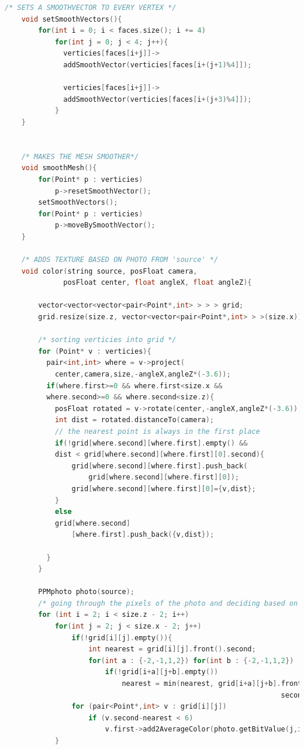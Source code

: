 \documentclass[12pt]{report}			%
\begin{document}
\begin{appendices}
\begin{lstlisting}[language = C++]
    /* SETS A SMOOTHVECTOR TO EVERY VERTEX */
    void setSmoothVectors(){
        for(int i = 0; i < faces.size(); i += 4)
            for(int j = 0; j < 4; j++){
              verticies[faces[i+j]]->
              addSmoothVector(verticies[faces[i+(j+1)%4]]);
                
              verticies[faces[i+j]]->
              addSmoothVector(verticies[faces[i+(j+3)%4]]);
            }
    }


    /* MAKES THE MESH SMOOTHER*/
    void smoothMesh(){
        for(Point* p : verticies)
            p->resetSmoothVector();
        setSmoothVectors();
        for(Point* p : verticies)
            p->moveBySmoothVector();
    }

    /* ADDS TEXTURE BASED ON PHOTO FROM 'source' */
    void color(string source, posFloat camera,
              posFloat center, float angleX, float angleZ){

        vector<vector<vector<pair<Point*,int> > > > grid;
        grid.resize(size.z, vector<vector<pair<Point*,int> > >(size.x));

        /* sorting verticies into grid */
        for (Point* v : verticies){
          pair<int,int> where = v->project(
            center,camera,size,-angleX,angleZ*(-3.6));
          if(where.first>=0 && where.first<size.x &&
          where.second>=0 && where.second<size.z){
            posFloat rotated = v->rotate(center,-angleX,angleZ*(-3.6));
            int dist = rotated.distanceTo(camera);
            // the nearest point is always in the first place
            if(!grid[where.second][where.first].empty() &&
            dist < grid[where.second][where.first][0].second){
                grid[where.second][where.first].push_back(
                    grid[where.second][where.first][0]);
                grid[where.second][where.first][0]={v,dist};
            } 
            else
            grid[where.second]
                [where.first].push_back({v,dist});

          }
        }

        PPMphoto photo(source);
        /* going through the pixels of the photo and deciding based on the distance whether the points will be colored or not */
        for (int i = 2; i < size.z - 2; i++)
            for(int j = 2; j < size.x - 2; j++)
                if(!grid[i][j].empty()){
                    int nearest = grid[i][j].front().second;
                    for(int a : {-2,-1,1,2}) for(int b : {-2,-1,1,2})
                        if(!grid[i+a][j+b].empty())
                            nearest = min(nearest, grid[i+a][j+b].front().
                                                                  second);
                for (pair<Point*,int> v : grid[i][j])
                    if (v.second-nearest < 6)
                        v.first->add2AverageColor(photo.getBitValue(j,i));
            }
    

\end{lstlisting}
\end{appendices}
\end{document}
